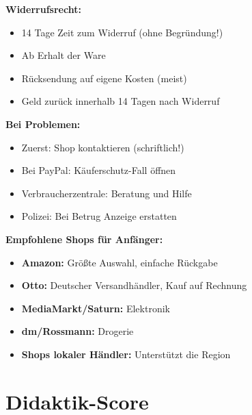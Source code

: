 \documentclass[11pt,a4paper]{article}
\begin{document}
\textbf{Widerrufsrecht:}
\begin{itemize}
    \item 14 Tage Zeit zum Widerruf (ohne Begründung!)
    \item Ab Erhalt der Ware
    \item Rücksendung auf eigene Kosten (meist)
    \item Geld zurück innerhalb 14 Tagen nach Widerruf
\end{itemize}

\textbf{Bei Problemen:}
\begin{itemize}
    \item Zuerst: Shop kontaktieren (schriftlich!)
    \item Bei PayPal: Käuferschutz-Fall öffnen
    \item Verbraucherzentrale: Beratung und Hilfe
    \item Polizei: Bei Betrug Anzeige erstatten
\end{itemize}

\textbf{Empfohlene Shops für Anfänger:}
\begin{itemize}
    \item \textbf{Amazon:} Größte Auswahl, einfache Rückgabe
    \item \textbf{Otto:} Deutscher Versandhändler, Kauf auf Rechnung
    \item \textbf{MediaMarkt/Saturn:} Elektronik
    \item \textbf{dm/Rossmann:} Drogerie
    \item \textbf{Shops lokaler Händler:} Unterstützt die Region
\end{itemize}

\section{Didaktik-Score}
\end{document}
